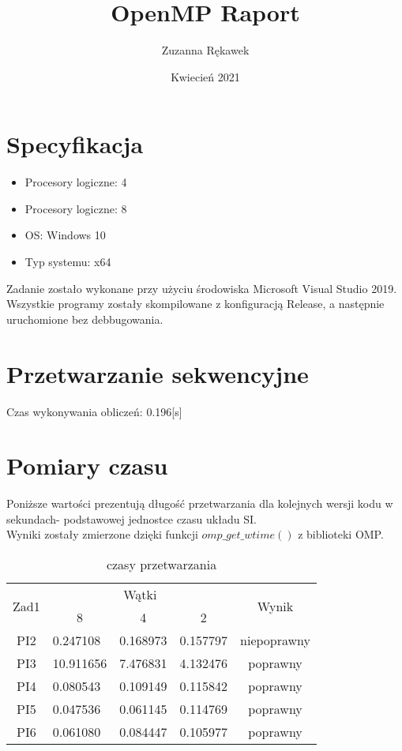 \documentclass{article}
\title{OpenMP Raport}
\author{Zuzanna Rękawek}
\date{Kwiecień 2021}
\begin{document}
\maketitle

\section{Specyfikacja}
\begin{itemize}
    \item Procesory logiczne: 4
    \item Procesory logiczne: 8
    \item OS: Windows 10
    \item Typ systemu: x64
\end{itemize}
Zadanie zostało wykonane przy użyciu środowiska Microsoft Visual Studio 2019. \\
Wszystkie programy zostały skompilowane z konfiguracją Release, a następnie uruchomione bez debbugowania. 

\section{Przetwarzanie sekwencyjne}
Czas wykonywania obliczeń: 0.196[s]

\section{Pomiary czasu}
Poniższe wartości prezentują długość przetwarzania dla kolejnych wersji kodu w sekundach- podstawowej jednostce czasu układu SI.\\
Wyniki zostały zmierzone dzięki funkcji $omp\_get\_wtime()$ z biblioteki OMP. \\
\begin{table}[!htb]
\centering
\begin{tabular}{|c|l|l|l|c|}
\hline
\multirow{2}{*}{Zad1} & \multicolumn{3}{c|}{Wątki}                                               & \multirow{2}{*}{Wynik} \\ \cline{2-4}
                      & \multicolumn{1}{c|}{8} & \multicolumn{1}{c|}{4} & \multicolumn{1}{c|}{2} &                        \\ \hline
PI2                   & 0.247108              & 0.168973               & 0.157797               & niepoprawny            \\ \hline
PI3                   & 10.911656              & 7.476831               & 4.132476               & poprawny               \\ \hline
PI4                   & 0.080543               & 0.109149               & 0.115842               & poprawny               \\ \hline
PI5                   & 0.047536               & 0.061145               & 0.114769               & poprawny               \\ \hline
PI6                   & 0.061080               & 0.084447               & 0.105977               & poprawny               \\ \hline
\end{tabular}
\caption{czasy przetwarzania}
\end{table}
\end{document}
